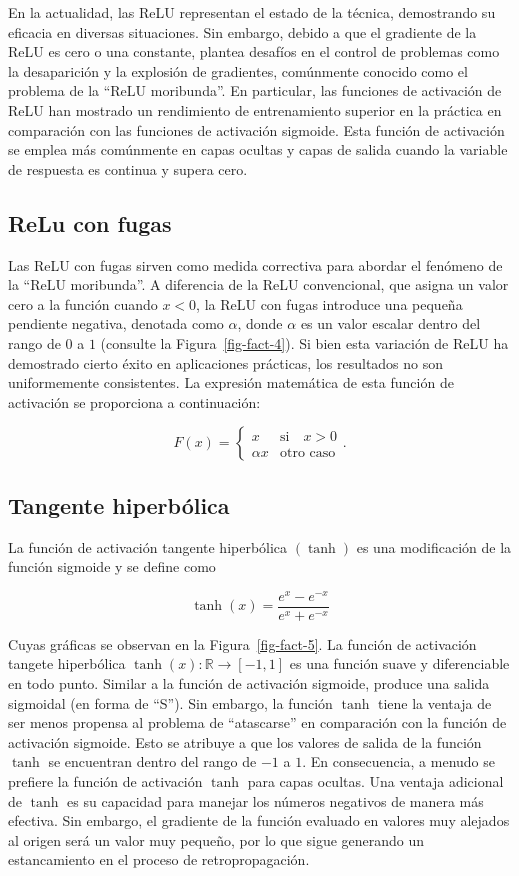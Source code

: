 \documentclass[
  us-letterpaper,
]{scrreprt}
\theoremstyle{plain}
\theoremstyle{definition}
\theoremstyle{plain}
\theoremstyle{definition}
\theoremstyle{remark}
\begin{document}
En la actualidad, las ReLU representan el estado de la técnica,
demostrando su eficacia en diversas situaciones. Sin embargo, debido a
que el gradiente de la ReLU es cero o una constante, plantea desafíos en
el control de problemas como la desaparición y la explosión de
gradientes, comúnmente conocido como el problema de la ``ReLU
moribunda''. En particular, las funciones de activación de ReLU han
mostrado un rendimiento de entrenamiento superior en la práctica en
comparación con las funciones de activación sigmoide. Esta función de
activación se emplea más comúnmente en capas ocultas y capas de salida
cuando la variable de respuesta es continua y supera cero.

\subsection{ReLu con fugas}\label{relu-con-fugas}

Las ReLU con fugas sirven como medida correctiva para abordar el
fenómeno de la ``ReLU moribunda''. A diferencia de la ReLU convencional,
que asigna un valor cero a la función cuando \(x < 0\), la ReLU con
fugas introduce una pequeña pendiente negativa, denotada como
\(\alpha\), donde \(\alpha\) es un valor escalar dentro del rango de
\(0\) a \(1\) (consulte la Figura~\ref{fig-fact-4}). Si bien esta
variación de ReLU ha demostrado cierto éxito en aplicaciones prácticas,
los resultados no son uniformemente consistentes. La expresión
matemática de esta función de activación se proporciona a continuación:

\[
F(x)=\begin{cases}x & \text{si}\quad x>0\\ \alpha x& \text{otro caso}\end{cases}.
\]

\subsection{Tangente hiperbólica}\label{tangente-hiperbuxf3lica}

La función de activación tangente hiperbólica \((\tanh)\) es una
modificación de la función sigmoide y se define como

\[
\tanh(x)=\frac{e^x-e^{-x}}{e^{x}+e^{-x}}
\]

Cuyas gráficas se observan en la Figura~\ref{fig-fact-5}. La función de
activación tangete hiperbólica \(\tanh(x):\mathbb R\to [-1,1]\) es una
función suave y diferenciable en todo punto. Similar a la función de
activación sigmoide, produce una salida sigmoidal (en forma de ``S'').
Sin embargo, la función \(\tanh\) tiene la ventaja de ser menos propensa
al problema de ``atascarse'' en comparación con la función de activación
sigmoide. Esto se atribuye a que los valores de salida de la función
\(\tanh\) se encuentran dentro del rango de \(-1\) a \(1\). En
consecuencia, a menudo se prefiere la función de activación \(\tanh\)
para capas ocultas. Una ventaja adicional de \(\tanh\) es su capacidad
para manejar los números negativos de manera más efectiva. Sin embargo,
el gradiente de la función evaluado en valores muy alejados al origen
será un valor muy pequeño, por lo que sigue generando un estancamiento
en el proceso de retropropagación.
\end{document}
